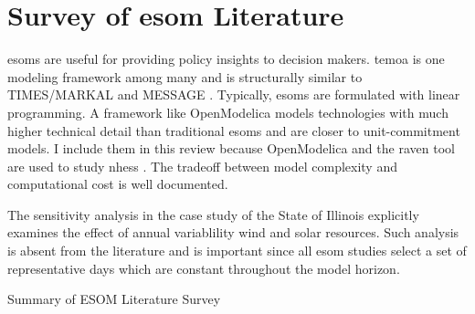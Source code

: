 \section{Survey of \gls{esom} Literature}

\glspl{esom} are useful for providing policy insights to decision makers. \gls{temoa}
is one modeling framework among many and is structurally similar to TIMES/MARKAL
and MESSAGE \cite{yue_review_2018}. Typically, \glspl{esom} are
formulated with linear programming. A framework like OpenModelica models technologies
with much higher technical detail than traditional \glspl{esom} and are closer
to unit-commitment models. I include them in this review because OpenModelica and
the \gls{raven} tool are used to study \glspl{nhes}
\cite{baker_optimal_2018,garcia_dynamic_2016,epiney_economic_2020}.
The tradeoff between model complexity and computational cost is well documented.

The sensitivity analysis in the case study of the State of Illinois explicitly
examines the effect of annual variablility wind and solar resources. Such analysis
is absent from the literature and is important since all \gls{esom} studies select
a set of representative days which are constant throughout the model horizon.

  \begin{table}
    \centering
    \caption{Summary of ESOM Literature Survey}
    \label{tab:esom_lit}
    \resizebox{\textwidth}{!}{}
  \end{table}


